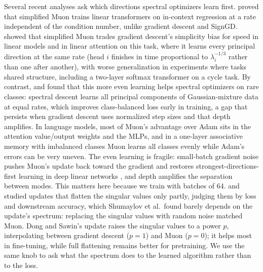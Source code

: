 Several recent analyses ask which directions spectral optimizers learn first. \citet{ma2026} proved that simplified Muon trains linear transformers on in-context regression at a rate independent of the condition number, unlike gradient descent and SignGD. \citet{dragutinovic2026} showed that simplified Muon trades gradient descent's simplicity bias for speed in linear models and in linear attention on this task, where it learns every principal direction at the same rate (head $i$ finishes in time proportional to $\lambda_i^{-1/3}$ rather than one after another), with worse generalization in experiments where tasks shared structure, including a two-layer softmax transformer on a cycle task. By contrast, \citet{vasudeva2025} and \citet{wang2025muon} found that this more even learning helps spectral optimizers on rare classes: spectral descent learns all principal components of Gaussian-mixture data at equal rates, which improves class-balanced loss early in training, a gap that persists when gradient descent uses normalized step sizes and that depth amplifies. In language models, most of Muon's advantage over Adam sits in the attention value/output weights and the MLPs, and in a one-layer associative memory with imbalanced classes Muon learns all classes evenly while Adam's errors can be very uneven. The even learning is fragile: small-batch gradient noise pushes Muon's update back toward the gradient and restores strongest-directions-first learning in deep linear networks \citep{jacobs2026}, and depth amplifies the separation between modes. This matters here because we train with batches of 64. \citet{dong2026muonp} and \citet{shumaylov2026} studied updates that flatten the singular values only partly, judging them by loss and downstream accuracy, which Shumaylov et al.\ found barely depends on the update's spectrum: replacing the singular values with random noise matched Muon. Dong and Sawin's update raises the singular values to a power $p$, interpolating between gradient descent ($p=1$) and Muon ($p=0$); it helps most in fine-tuning, while full flattening remains better for pretraining. We use the same knob to ask what the spectrum does to the learned algorithm rather than to the loss.
